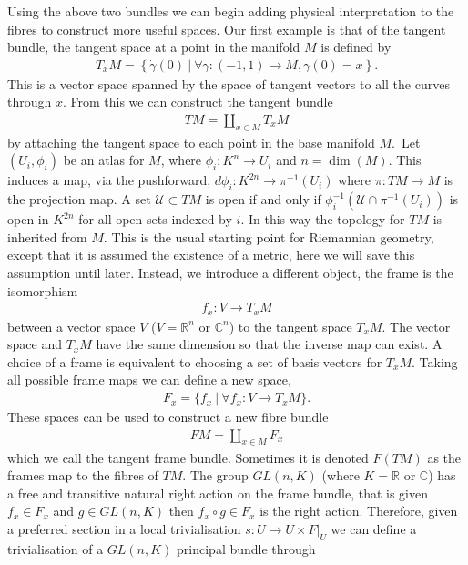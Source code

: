 \documentclass[10pt]{report}
\theoremstyle{definition}
\newcommand{\R}[0]{\mathbb{R}}
\newcommand{\C}[0]{\mathbb{C}}
\begin{document}
Using the above two bundles we can begin adding physical interpretation to the fibres to construct more useful spaces. Our first example is that of the tangent bundle, the tangent space at a point in the manifold $M$ is defined by
\begin{align}
    T_x M = \left\{\left. \dot{\gamma}(0)\ \right|\ \forall \gamma : (-1,1) \rightarrow M, \gamma(0) = x\right\}.
\end{align}
This is a vector space spanned by the space of tangent vectors to all the curves through $x$. From this we can construct the tangent bundle 
\begin{align}
    TM = \coprod_{x \in M} T_x M
\end{align}
by attaching the tangent space to each point in the base manifold $M$.~Let $ (U_i, \phi_i) $ be an atlas for $M$, where $\phi_i : K^n \rightarrow U_i$ and $n = \dim(M)$. This induces a map, via the pushforward, $d\phi_i : K^{2n} \rightarrow \pi^{-1}(U_i)$ where $\pi : TM \rightarrow M$ is the projection map. A set $\mathcal{U} \subset TM$ is open if and only if $\phi_i^{-1}(\mathcal{U} \cap \pi^{-1}(U_i))$ is open in $K^{2n}$ for all open sets indexed by $i$. In this way the topology for $TM$ is inherited from $M$. This is the usual starting point for Riemannian geometry, except that it is assumed the existence of a metric, here we will save this assumption until later. Instead, we introduce a different object, the frame is the isomorphism
\begin{align}
    f_x : V \rightarrow T_x M
\end{align}
between a vector space $V$ ($V = \mathbb{R}^n$ or $\mathbb{C}^n$) to the tangent space $T_x M$. The vector space and $T_x M$ have the same dimension so that the inverse map can exist. A choice of a frame is equivalent to choosing a set of basis vectors for $T_x M$. Taking all possible frame maps we can define a new space,
\begin{align}
    F_x = \{f_x\ |\ \forall f_x : V \rightarrow T_x M\}.
\end{align}
These spaces can be used to construct a new fibre bundle
\begin{align}
    FM = \coprod_{x \in M} F_x
\end{align}
which we call the tangent frame bundle. Sometimes it is denoted $F(TM)$ as the frames map to the fibres of $TM$. The group $GL(n,K)$ (where $K = \R$ or $\C$) has a free and transitive natural right action on the frame bundle, that is given $f_x \in F_x$ and $g \in GL(n,K)$ then $f_x \circ g \in F_x$ is the right action. Therefore, given a preferred section in a local trivialisation $s : U \rightarrow U \times F|_U$ we can define a trivialisation of a $GL(n,K)$ principal bundle through 
\end{document}
